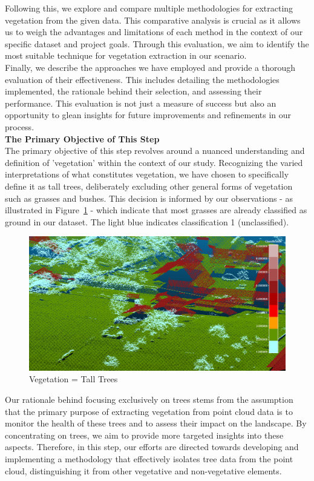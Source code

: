 \documentclass{article}
\begin{document}
\noindent Following this, we explore and compare multiple methodologies for extracting vegetation from the given data. This comparative analysis is crucial as it allows us to weigh the advantages and limitations of each method in the context of our specific dataset and project goals. Through this evaluation, we aim to identify the most suitable technique for vegetation extraction in our scenario.\\

\noindent Finally, we describe the approaches we have employed and provide a thorough evaluation of their effectiveness. This includes detailing the methodologies implemented, the rationale behind their selection, and assessing their performance. This evaluation is not just a measure of success but also an opportunity to glean insights for future improvements and refinements in our process. \\

\noindent \textbf{The Primary Objective of This Step}\\
The primary objective of this step revolves around a nuanced understanding and definition of 'vegetation' within the context of our study. Recognizing the varied interpretations of what constitutes vegetation, we have chosen to specifically define it as tall trees, deliberately excluding other general forms of vegetation such as grasses and bushes. This decision is informed by our observations - as illustrated in Figure~\ref{fig13} - which indicate that most grasses are already classified as ground in our dataset. The light blue indicates classification 1 (unclassified).\\

\begin{figure}[H]
    \centering
    \includegraphics[width=0.7\linewidth]{Figures/heights_3d.png}
    \caption{Vegetation = Tall Trees}
    \label{fig13}
\end{figure}

\noindent Our rationale behind focusing exclusively on trees stems from the assumption that the primary purpose of extracting vegetation from point cloud data is to monitor the health of these trees and to assess their impact on the landscape. By concentrating on trees, we aim to provide more targeted insights into these aspects. Therefore, in this step, our efforts are directed towards developing and implementing a methodology that effectively isolates tree data from the point cloud, distinguishing it from other vegetative and non-vegetative elements.\\
\end{document}
